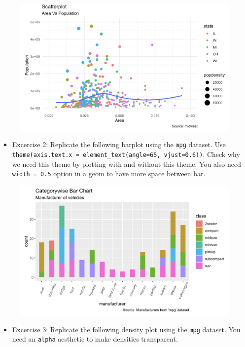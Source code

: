 \documentclass[]{book}
\providecommand{\tightlist}{%
  \setlength{\itemsep}{0pt}\setlength{\parskip}{0pt}}
\begin{document}
\begin{figure}[htbp]
\centering
\includegraphics{practice1.png}
\caption{}
\end{figure}

\begin{itemize}
\tightlist
\item
  Excercise 2: Replicate the following barplot using the \texttt{mpg}
  dataset. Use
  \texttt{theme(axis.text.x\ =\ element\_text(angle=65,\ vjust=0.6))}.
  Check why we need this theme by plotting with and without this theme.
  You also need \texttt{width\ =\ 0.5} option in a geom to have more
  space between bar.
\end{itemize}

\begin{figure}[htbp]
\centering
\includegraphics{practice2.png}
\caption{}
\end{figure}

\begin{itemize}
\tightlist
\item
  Excercise 3: Replicate the following density plot using the
  \texttt{mpg} dataset. You need an \texttt{alpha} aesthetic to make
  densities transparent.
\end{itemize}
\end{document}
